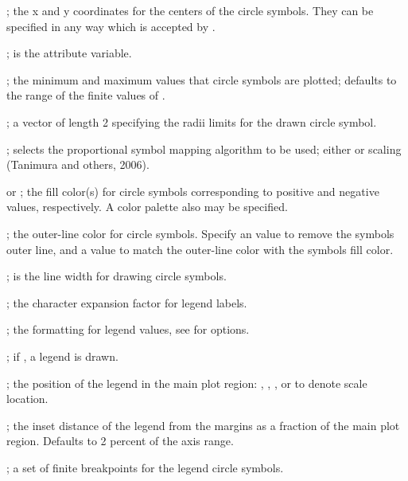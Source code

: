 \documentclass[letterpaper]{book}
\begin{document}
\begin{Arguments}
\begin{ldescription}
\item[\code{x, y}] ; the x and y coordinates for the centers of the circle symbols. They can be specified in any way which is accepted by .
\item[\code{z}] ; is the attribute variable.
\item[\code{zlim}] ; the minimum and maximum  values that circle symbols are plotted; defaults to the range of the finite values of .
\item[\code{inches}] ; a vector of length 2 specifying the radii limits for the drawn circle symbol.
\item[\code{scaling}] ; selects the proportional symbol mapping algorithm to be used; either  or  scaling (Tanimura and others, 2006).
\item[\code{bg.pos, bg.neg}]  or ; the fill color(s) for circle symbols corresponding to positive and negative  values, respectively.
A color palette also may be specified.
\item[\code{fg}] ; the outer-line color for circle symbols.
Specify an  value to remove the symbols outer line, and a  value to match the outer-line color with the symbols fill color.
\item[\code{lwd}] ; is the line width for drawing circle symbols.
\item[\code{cex}] ; the character expansion factor for legend labels.
\item[\code{format}] ; the formatting for legend values, see  for options.
\item[\code{draw.legend}] ; if , a legend is drawn.
\item[\code{loc}] ; the position of the legend in the main plot region: , , , or  to denote scale location.
\item[\code{inset}] ; the inset distance of the legend from the margins as a fraction of the main plot region.
Defaults to 2 percent of the axis range.
\item[\code{breaks}] ; a set of finite breakpoints for the legend circle symbols.

\end{ldescription}
\end{Arguments}
\end{document}
